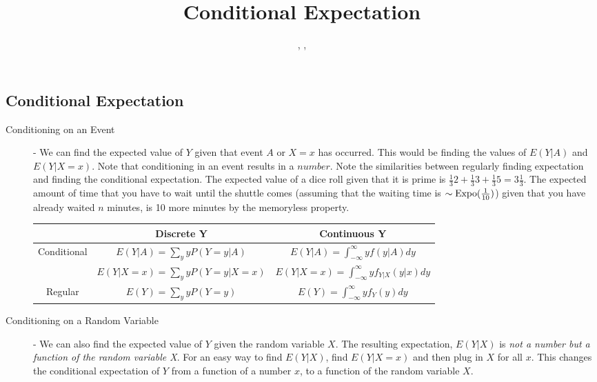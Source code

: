 \documentclass[11.5pt]{article}
\title{Conditional Expectation}
\author{\shira, \tim, \creds}
\begin{document}
\maketitle

\begin{notes}
\section*{Conditional Expectation}
\begin{description}
	\item[Conditioning on an Event] - We can find the expected value of $Y$ given that event $A$ or $X=x$ has occurred. This would be finding the values of $E(Y|A)$ and $E(Y|X = x)$. Note that conditioning in an event results in a $number$. Note the similarities between regularly finding expectation and finding the conditional expectation. The expected value of a dice roll given that it is prime is $\frac{1}{3}2 + \frac{1}{3}3 + \frac{1}{3}5 = 3\frac{1}{3}$. The expected amount of time that you have to wait until the shuttle comes (assuming that the waiting time is $\sim \textrm{Expo}(\frac{1}{10})$) given that you have already waited $n$ minutes, is 10 more minutes by the memoryless property.
		\begin{table}[htb!]
		   \centering
			\begin{tabular}{ccc}
			\toprule
				 ~& \textbf{Discrete Y} & \textbf{Continuous Y} \\
			\midrule
				 Conditional & $E(Y|A) = \sum_y yP(Y=y|A)$ & $E(Y|A) = \int_{-\infty}^\infty yf(y|A)dy$ \\ 
				 ~ & $E(Y|X=x) = \sum_y yP(Y=y|X=x)$ & $E(Y|X=x) =\int_{-\infty}^\infty yf_{Y|X}(y|x)dy$ \\
			\midrule
			Regular & $E(Y) = \sum_y yP(Y=y)$ & $E(Y) =\int_{-\infty}^\infty yf_Y(y)dy$ \\
			\bottomrule
			\end{tabular}
		\end{table}
	\vspace{-.45 cm}
	\item[Conditioning on a Random Variable] - We can also find the expected value of $Y$ given the random variable $X$. The resulting expectation, $E(Y|X)$ is \emph{not a number but a function of the random variable X}. For an easy way to find $E(Y|X)$, find $E(Y|X = x)$ and then plug in $X$ for all $x$. This changes the conditional expectation of $Y$ from a function of a number $x$, to a function of the random variable $X$.


\end{description}
\end{notes}
\end{document}
